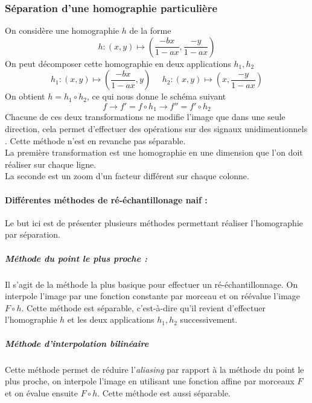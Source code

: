 \subsubsection{Séparation d'une homographie particulière }

On considère une homographie $h$ de la forme 
\begin{equation*}
h:(x,y)\mapsto \left(\frac{-bx}{1-ax},\frac{-y}{1-ax}\right)
\end{equation*}
On peut décomposer cette homographie en deux applications $h_1 , h_2$
\begin{equation*}
h_1:(x,y) \mapsto \left(\frac{-bx}{1-ax}    ,y\right)~~~~~~h_2:(x,y) \mapsto \left(x,\frac{-y}{1-ax}\right)
\end{equation*}
On obtient $h=h_1  \circ h_2$, ce qui nous donne le schéma suivant 
\begin{equation*}
f\longrightarrow f'=f\circ h_1 \longrightarrow f''=f'\circ h_2
\end{equation*}
Chacune de ces deux transformations ne modifie l'image que dans une seule direction, cela permet d'effectuer des opérations sur des signaux unidimentionnels . Cette méthode n'est en revanche pas séparable.\\ 
La première transformation est une homographie en une dimension que l'on doit réaliser sur chaque ligne.\\ %
La seconde est un zoom d'un facteur différent sur chaque colonne.

\paragraph{Différentes méthodes de ré-échantillonage naif :}
Le but ici est de présenter plusieurs méthodes permettant réaliser l'homographie par séparation.

\subparagraph{Méthode du point le plus proche :}
Il s'agit de la méthode la plus basique pour effectuer un ré-échantillonnage. On interpole l'image  par une fonction constante par morceau et on réévalue l'image $F\circ h $. Cette méthode est séparable, c'est-à-dire qu'il revient d'effectuer l'homographie $h$ et les deux applications $h_1 , h_2$ successivement.

\subparagraph{Méthode d'interpolation bilinéaire}
Cette méthode permet de réduire l'\emph{aliasing} par rapport à la méthode du point le plus proche, on interpole l'image en utilisant une fonction affine par morceaux $F$ et on évalue ensuite $F\circ h$. Cette méthode est aussi séparable.

